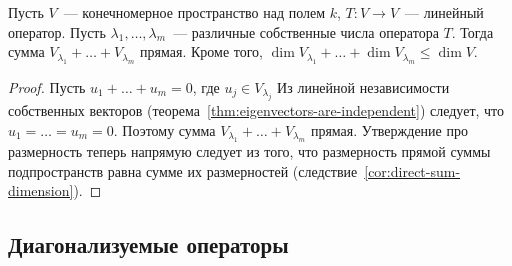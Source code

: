 \begin{proposition}\label{prop:sum-of-eigenspaces-is-direct}
Пусть $V$~--- конечномерное пространство над полем $k$,
$T\colon V\to V$~--- линейный оператор. Пусть
$\lambda_1,\dots,\lambda_m$~--- различные собственные числа
оператора $T$.
Тогда сумма $V_{\lambda_1} + \dots + V_{\lambda_m}$ прямая.
Кроме того, $\dim V_{\lambda_1} + \dots + \dim V_{\lambda_m}\leq
\dim V$.
\end{proposition}
\begin{proof}
Пусть $u_1 + \dots + u_m = 0$, где $u_j\in V_{\lambda_j}$
Из линейной независимости собственных векторов
(теорема~\ref{thm:eigenvectors-are-independent})
следует, что $u_1 = \dots = u_m = 0$. Поэтому сумма
$V_{\lambda_1} + \dots + V_{\lambda_m}$ прямая.
Утверждение про размерность теперь напрямую следует из того,
что размерность прямой суммы подпространств равна сумме
их размерностей (следствие~\ref{cor:direct-sum-dimension}).
\end{proof}


\subsection{Диагонализуемые операторы}\label{subsect:diagonalizable}


